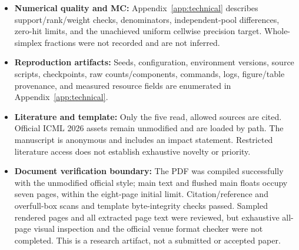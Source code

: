 \documentclass{article}
\theoremstyle{plain}
\begin{document}
\begin{itemize}
\item \textbf{Numerical quality and MC:} Appendix~\ref{app:technical} describes support/rank/weight checks, denominators, independent-pool differences, zero-hit limits, and the unachieved uniform cellwise precision target. Whole-simplex fractions were not recorded and are not inferred.
\item \textbf{Reproduction artifacts:} Seeds, configuration, environment versions, source scripts, checkpoints, raw counts/components, commands, logs, figure/table provenance, and measured resource fields are enumerated in Appendix~\ref{app:technical}.
\item \textbf{Literature and template:} Only the five read, allowed sources are cited. Official ICML 2026 assets remain unmodified and are loaded by path. The manuscript is anonymous and includes an impact statement. Restricted literature access does not establish exhaustive novelty or priority.
\item \textbf{Document verification boundary:} The PDF was compiled successfully with the unmodified official style; main text and flushed main floats occupy seven pages, within the eight-page initial limit. Citation/reference and overfull-box scans and template byte-integrity checks passed. Sampled rendered pages and all extracted page text were reviewed, but exhaustive all-page visual inspection and the official venue format checker were not completed. This is a research artifact, not a submitted or accepted paper.
\end{itemize}
\end{document}
